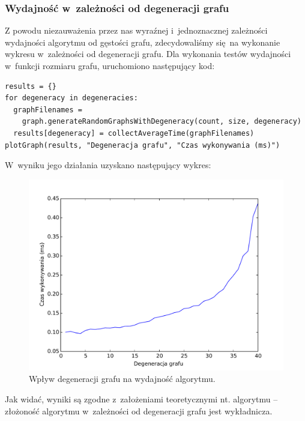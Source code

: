 \documentclass[11pt,a4paper]{article}
\begin{document}
\newpage
\subsubsection{Wydajność w~zależności od degeneracji grafu}
Z powodu niezauważenia przez nas wyraźnej i~jednoznacznej zależności wydajności algorytmu od gęstości grafu, zdecydowaliśmy się na wykonanie wykresu w~zależności od degeneracji grafu. Dla wykonania testów wydajności w~funkcji rozmiaru grafu, uruchomiono następujący kod:\\

\begin{lstlisting}[caption = Testy wydajności w~zależności od degeneracji grafu]
results = {}
for degeneracy in degeneracies:
  graphFilenames =
    graph.generateRandomGraphsWithDegeneracy(count, size, degeneracy)
  results[degeneracy] = collectAverageTime(graphFilenames)
plotGraph(results, "Degeneracja grafu", "Czas wykonywania (ms)")
\end{lstlisting}

W~wyniku jego działania uzyskano następujący wykres:

\begin{figure}[H]
\includegraphics[trim = 0mm 2mm 0mm 12mm, clip, width=14cm]{img/degeneracy.pdf}
\caption{Wpływ degeneracji grafu na wydajność algorytmu.}
\end{figure}

Jak widać, wyniki są zgodne z~założeniami teoretycznymi nt. algorytmu -- złożoność algorytmu w~zależności od degeneracji grafu jest wykładnicza.
\end{document}
